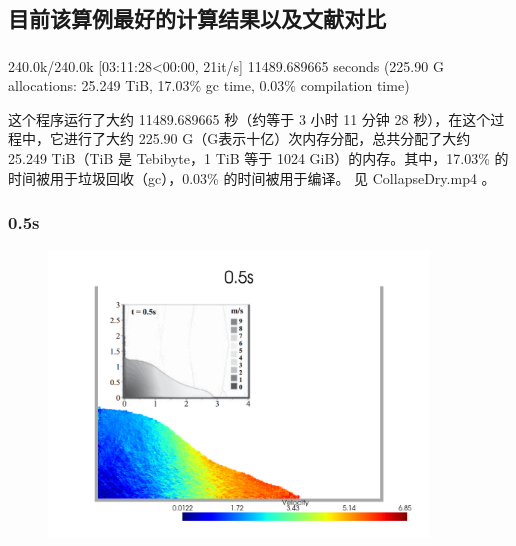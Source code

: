 \subsection{目前该算例最好的计算结果以及文献对比}

\begin{frame}
    \frametitle{\subsecname}

    240.0k/240.0k [03:11:28<00:00, 21it/s]
    11489.689665 seconds (225.90 G allocations: 25.249 TiB, 17.03\% gc time, 0.03\% compilation time)

    这个程序运行了大约 11489.689665 秒（约等于 3 小时 11 分钟 28 秒），在这个过程中，它进行了大约 225.90 G（G表示十亿）次内存分配，总共分配了大约 25.249 TiB（TiB 是 Tebibyte，1 TiB 等于 1024 GiB）的内存。其中，17.03\% 的时间被用于垃圾回收（gc），0.03\% 的时间被用于编译。
    见 CollapseDry.mp4 。
\end{frame}

\begin{frame}
    \frametitle{\subsecname 0.5s}
    \begin{figure}[H]
        \centering
        \includegraphics[width=0.9\textwidth]{images/collapse_dry05_combined.png}
    \end{figure}
\end{frame}

